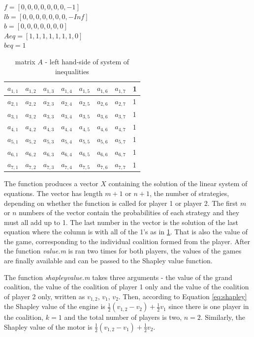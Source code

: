 $f = [0, 0, 0, 0, 0, 0, 0, -1]$ \\
$lb = [0, 0, 0, 0, 0, 0, 0, -Inf]$ \\
$b = [0, 0, 0, 0, 0, 0, 0]$ \\
$Aeq = [ 1, 1, 1, 1, 1, 1, 1, 0 ]$ \\
$beq = 1$

\begin{table}[h]
\centering 
\begin{tabular}{ |m{0.5cm}|m{0.5cm}|m{0.5cm}|m{0.5cm}|m{0.5cm}|m{0.5cm}|m{0.5cm}|m{0.5cm}| } 
\hline
 $a_{1,1}$ & $a_{1,2}$ & $a_{1,3}$ & $a_{1,4}$ & $a_{1,5}$ & $a_{1,6}$ & $a_{1,7}$ & 1 \\ \hline
 $a_{2,1}$ & $a_{2,2}$ & $a_{2,3}$ & $a_{2,4}$ & $a_{2,5}$ & $a_{2,6}$ & $a_{2,7}$ & 1 \\ \hline
 $a_{3,1}$ & $a_{3,2}$ & $a_{3,3}$ & $a_{3,4}$ & $a_{3,5}$ & $a_{3,6}$ & $a_{3,7}$ & 1 \\ \hline
 $a_{4,1}$ & $a_{4,2}$ & $a_{4,3}$ & $a_{4,4}$ & $a_{4,5}$ & $a_{4,6}$ & $a_{4,7}$ & 1 \\ \hline
 $a_{5,1}$ & $a_{5,2}$ & $a_{5,3}$ & $a_{5,4}$ & $a_{5,5}$ & $a_{5,6}$ & $a_{5,7}$ & 1 \\ \hline
 $a_{6,1}$ & $a_{6,2}$ & $a_{6,3}$ & $a_{6,4}$ & $a_{6,5}$ & $a_{6,6}$ & $a_{6,7}$ & 1 \\ \hline
 $a_{7,1}$ & $a_{7,2}$ & $a_{7,3}$ & $a_{7,4}$ & $a_{7,5}$ & $a_{7,6}$ & $a_{7,7}$ & 1 \\ \hline
\end{tabular}
\caption{ matrix $A$ - left hand-side of system of inequalities}
\label{tab:A}
\end{table}

The function produces a vector $X$ containing the solution of the linear system of equations. The vector has length $m+1$ or $n+1$, the number of strategies, depending on whether the function is called for player 1 or player 2. The first $m$ or $n$ numbers of the vector contain the probabilities of each strategy and they must all add up to 1. The last number in the vector is the solution of the last equation where the column is with all of the 1's as in \ref{tab:A}. That is also the value of the game, corresponding to the individual coalition formed from the player. After the function \textit{value.m} is ran two times for both players, the values of the games are finally available and can be passed to the Shapley value function.

The function \textit{shapleyvalue.m} takes three arguments - the value of the grand coalition, the value of the coalition of player 1 only and the value of the coalition of player 2 only, written as $v_{1,2}$, $v_1$, $v_2$. Then, according to Equation \ref{eq:shapley} the Shapley value of the engine is $\frac{1}{2} (v_{1,2} - v_2) + \frac{1}{2} v_1$ since there is one player in the coalition, $k = 1$ and the total number of players is two, $n = 2$. Similarly, the Shapley value of the motor is $\frac{1}{2} (v_{1,2} - v_1) + \frac{1}{2} v_2$.

